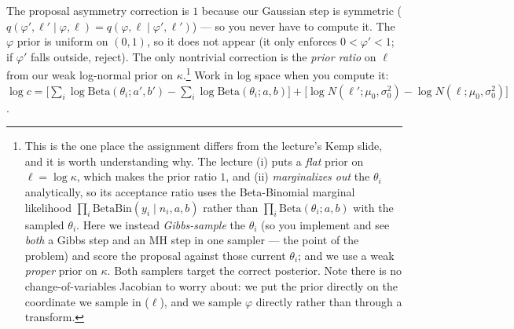\documentclass[11pt]{article}
\begin{document}
\begin{enumerate}
\begin{enumerate}
The proposal asymmetry correction is $1$ because our Gaussian step is symmetric ($q(\varphi',\ell'\mid\varphi,\ell) = q(\varphi,\ell\mid\varphi',\ell')$) --- so you never have to compute it. The $\varphi$ prior is uniform on $(0,1)$, so it does not appear (it only enforces $0 < \varphi' < 1$; if $\varphi'$ falls outside, reject). The only nontrivial correction is the {\em prior ratio} on $\ell$ from our weak log-normal prior on $\kappa$.\footnote{This is the one place the assignment differs from the lecture's Kemp slide, and it is worth understanding why. The lecture (i) puts a {\em flat} prior on $\ell=\log\kappa$, which makes the prior ratio $1$, and (ii) {\em marginalizes out} the $\theta_i$ analytically, so its acceptance ratio uses the Beta-Binomial marginal likelihood $\prod_i \mathrm{BetaBin}(y_i\mid n_i,a,b)$ rather than $\prod_i \mathrm{Beta}(\theta_i;a,b)$ with the sampled $\theta_i$. Here we instead {\em Gibbs-sample} the $\theta_i$ (so you implement and see {\em both} a Gibbs step and an MH step in one sampler --- the point of the problem) and score the proposal against those current $\theta_i$; and we use a weak {\em proper} prior on $\kappa$. Both samplers target the correct posterior. Note there is no change-of-variables Jacobian to worry about: we put the prior directly on the coordinate we sample in ($\ell$), and we sample $\varphi$ directly rather than through a transform.} Work in log space when you compute it: $\log c = \big[\sum_i \log\mathrm{Beta}(\theta_i;a',b') - \sum_i \log\mathrm{Beta}(\theta_i;a,b)\big] + \big[\log N(\ell';\mu_0,\sigma_0^2) - \log N(\ell;\mu_0,\sigma_0^2)\big]$.


\end{enumerate}
\end{enumerate}
\end{document}

